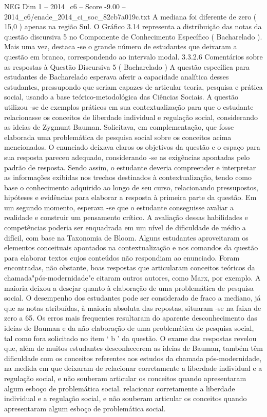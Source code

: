 \begin{textsample}{NEG Dim 1 – 2014\_c6 – Score -9.00 – 2014\_c6/enade\_2014\_ci\_soc\_82cb7a019c.txt}
A mediana foi diferente de zero ( 15,0 ) apenas na região Sul.
O Gráfico 3.14 representa a distribuição das notas da questão discursiva 5 no Componente de Conhecimento Específico ( Bacharelado ).
Mais uma vez, destaca -se o grande número de estudantes que deixaram a questão em branco, correspondendo ao intervalo modal. 3.3.2.6 Comentários sobre as respostas à Questão Discursiva 5 ( Bacharelado ) A questão específica para estudantes de Bacharelado esperava aferir a capacidade analítica desses estudantes, pressupondo que seriam capazes de articular teoria, pesquisa e prática social, usando a base teórico-metodológica das Ciências Sociais.
A questão utilizou -se de exemplos práticos em sua contextualização para que o estudante relacionasse os conceitos de liberdade individual e regulação social, considerando as ideias de Zygmunt Bauman.
Solicitava, em complementação, que fosse elaborada uma problemática de pesquisa social sobre os conceitos acima mencionados.
O enunciado deixava claros os objetivos da questão e o espaço para sua resposta pareceu adequado, considerando -se as exigências apontadas pelo padrão de resposta.
Sendo assim, o estudante deveria compreender e interpretar as informações exibidas nos trechos destinados à contextualização, tendo como base o conhecimento adquirido ao longo de seu curso, relacionando pressupostos, hipóteses e evidências para elaborar a resposta à primeira parte da questão.
Em um segundo momento, esperava -se que o estudante conseguisse avaliar a realidade e construir um pensamento crítico.
A avaliação dessas habilidades e competências poderia ser enquadrada em um nível de dificuldade de médio a difícil, com base na Taxonomia de Bloom.
Alguns estudantes aproveitaram os elementos conceituais apontados na contextualização e nos comandos da questão para elaborar textos cujos conteúdos não respondiam ao enunciado.
Foram encontradas, não obstante, boas respostas que articularam conceitos teóricos da chamada"pós-modernidade"e citaram outros autores, como Marx, por exemplo.
A maioria deixou a desejar quanto à elaboração de uma problemática de pesquisa social.
O desempenho dos estudantes pode ser considerado de fraco a mediano, já que as notas atribuídas, à maioria absoluta das repostas, situaram -se na faixa de zero a 65.
Os erros mais frequentes resultaram do aparente desconhecimento das ideias de Bauman e da não elaboração de uma problemática de pesquisa social, tal como fora solicitado no item ‘ b ’ da questão.
O exame das respostas revelou que, além de muitos estudantes desconhecerem as ideias de Bauman, também têm dificuldade com os conceitos referentes aos estudos da chamada pós-modernidade, na medida em que deixaram de relacionar corretamente a liberdade individual e a regulação social, e não souberam articular os conceitos quando apresentaram algum esboço de problemática social. relacionar corretamente a liberdade individual e a regulação social, e não souberam articular os conceitos quando apresentaram algum esboço de problemática social.

\end{textsample}
